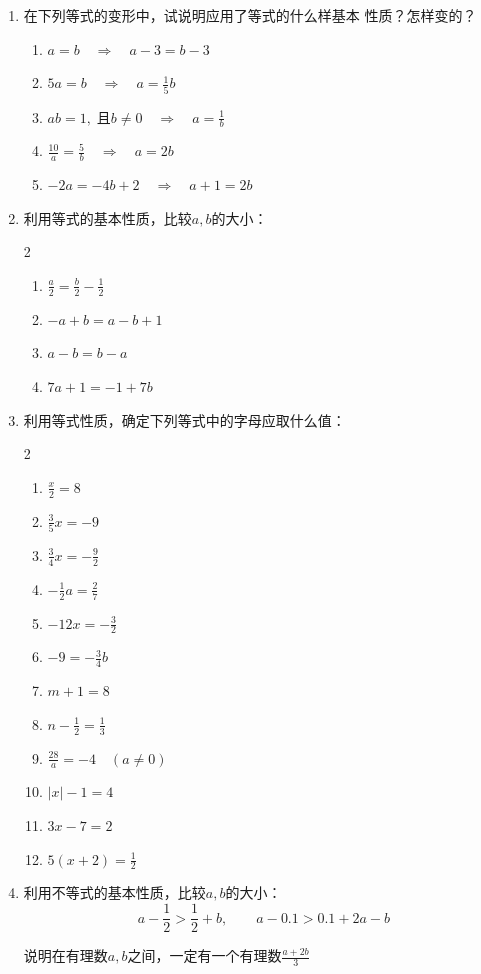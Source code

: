 \begin{enumerate}
	\item  在下列等式的变形中，试说明应用了等式的什么样基本
	性质？怎样变的？
	\begin{enumerate}
		\item $a=b\quad \Rightarrow\quad a-3=b-3$
		\item $ 5a=b  \quad \Rightarrow\quad  a=\frac{1}{5}b $
		\item  $ ab=1,\; \text{且}b\ne 0  \quad \Rightarrow\quad  a=\frac{1}{b} $
		\item  $ \frac{10}{a}=\frac{5}{b}  \quad \Rightarrow\quad a=2b  $
		\item $ -2a=-4b+2  \quad \Rightarrow\quad  a+1=2b $
	\end{enumerate}
	
	\item 利用等式的基本性质，比较$a,b$的大小：
	\begin{multicols}{2}
		\begin{enumerate}
			\item $\frac{a}{2}=\frac{b}{2}-\frac{1}{2}$
			\item $-a+b=a-b+1$
			\item $a-b=b-a$
			\item $7a+1=-1+7b$
		\end{enumerate}
	\end{multicols}
	
	\item 利用等式性质，确定下列等式中的字母应取什么值：
	\begin{multicols}{2}
		\begin{enumerate}
			\item $\frac{x}{2}=8 $
			\item $\frac{3}{5}x=-9 $
			\item $\frac{3}{4}x=-\frac{9}{2} $
			\item $-\frac{1}{2}a=\frac{2}{7} $
			\item $-12x=-\frac{3}{2} $
			\item $-9=-\frac{3}{4}b $
			\item $m+1=8 $
			\item $n-\frac{1}{2}=\frac{1}{3} $
			\item $\frac{28}{a}=-4\quad (a\ne 0) $
			\item $|x|-1=4 $
			\item $3x-7=2 $
			\item $5(x+2)=\frac{1}{2} $
		\end{enumerate}
	\end{multicols}
	
	\item 利用不等式的基本性质，比较$a, b$的大小：
	\[a-\frac{1}{2}>\frac{1}{2}+b,\qquad a-0.1>0.1+2a-b \]
	
	\staritem 说明在有理数$a, b$之间，一定有一个有理数$\frac{a+2b}{3}$
\end{enumerate}


